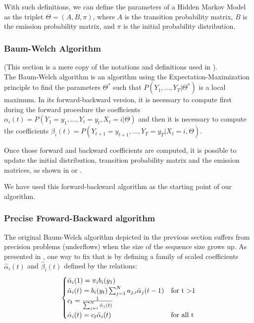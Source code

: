 With such definitions, we can define the parameters of a Hidden Markov Model as the triplet $\Theta = (A, B, \pi)$, where $A$ is the transition probability matrix, $B$ is the emission probability matrix, and $\pi$ is the initial probability distribution.
\subsubsection*{Baum-Welch Algorithm}
(This section is a mere copy of the notations and definitions used in \cite{wiki:BaumWelch_algorithm}).\\
The Baum-Welch algorithm is an algorithm using the Expectation-Maximization principle to find the parameters $\Theta^*$ such that $P(Y_1,...,Y_T| \Theta^* )$ is a local maximum.
In its forward-backward version, it is necessary to compute first during the forward procedure the coefficients $\alpha_i(t) = P(Y_1=y_1,...,Y_t = y_t, X_t = i | \Theta )$ and then it is necessary to compute the coefficients $\beta_i(t) = P(Y_{t+1}=y_{t+1},...,Y_T = y_T| X_t = i, \Theta )$.

Once those forward and backward coefficients are computed, it is possible to update the initial distribution, transition probability matrix and the emission matrices, as shown in \cite{rabiner1989tutorial} or \cite{wiki:BaumWelch_algorithm}.

We have used this forward-backward algorithm as the starting point of our algorithm.
\subsubsection*{Precise Froward-Backward algorithm}
The original Baum-Welch algorithm depicted in the previous section suffers from precision problems (underflows) when the size of the sequence size grows up.
As presented in \cite{rabiner1989tutorial}, one way to fix that is by defining a family of scaled coefficients $\hat{\alpha}_i(t)$ and $\hat{\beta}_i(t)$ defined by the relations:
\begin{equation}
\begin{cases}
\bar{\alpha}_i(1) = \pi_i b_i(y_1) & \\
\bar{\alpha}_i(t) = b_i(y_t)\sum_{j=1}^{N}{a_{j,i}\bar{\alpha}_j(t-1)} & \text{for t \textgreater 1} \\
c_t = \frac{1}{\sum^N_{j=1} \bar{\alpha}_j(t)} & \\
\hat{\alpha}_i(t) = c_t \bar{\alpha}_i(t) & \text{for all t}
\end{cases}
\end{equation}

